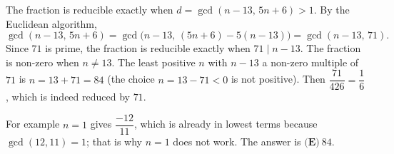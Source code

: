 The fraction is reducible exactly when $d=\gcd(n-13,\,5n+6)>1$. By the Euclidean algorithm,
\[
\gcd(n-13,\,5n+6)=\gcd\big(n-13,\,(5n+6)-5(n-13)\big)=\gcd(n-13,\,71).
\]
Since $71$ is prime, the fraction is reducible exactly when $71\mid n-13$. The fraction is non-zero when $n\ne13$. The least positive $n$ with $n-13$ a non-zero multiple of $71$ is $n=13+71=84$ (the choice $n=13-71<0$ is not positive). Then $\dfrac{71}{426}=\dfrac{1}{6}$, which is indeed reduced by $71$.

For example $n=1$ gives $\dfrac{-12}{11}$, which is already in lowest terms because $\gcd(12,11)=1$; that is why $n=1$ does not work. The answer is $\boxed{\textbf{(E)}\ 84}$.
